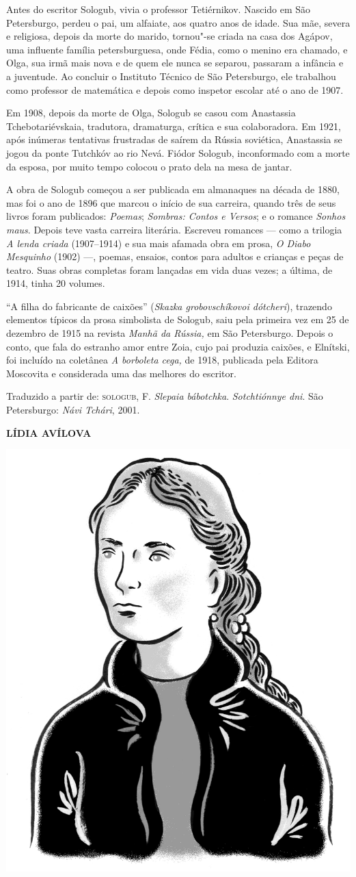 Antes do escritor Sologub, vivia o professor Tetiérnikov. Nascido em São
Petersburgo, perdeu o pai, um alfaiate, aos quatro anos de idade. Sua
mãe, severa e religiosa, depois da morte do marido, tornou"-se criada na
casa dos Agápov, uma influente família petersburguesa, onde Fédia, como
o menino era chamado, e Olga, sua irmã mais nova e de quem ele nunca se
separou, passaram a infância e a juventude. Ao concluir o Instituto
Técnico de São Petersburgo, ele trabalhou como professor de matemática e
depois como inspetor escolar até o ano de 1907.

Em 1908, depois da morte de Olga, Sologub se casou com Anastassia
Tchebotariévskaia, tradutora, dramaturga, crítica e sua colaboradora. Em
1921, após inúmeras tentativas frustradas de saírem da Rússia soviética,
Anastassia se jogou da ponte Tutchkóv ao rio Nevá. Fiódor Sologub,
inconformado com a morte da esposa, por muito tempo colocou o prato dela
na mesa de jantar.

A obra de Sologub começou a ser publicada em almanaques na década de
1880, mas foi o ano de 1896 que marcou o início de sua carreira, quando
três de seus livros foram publicados: \emph{Poemas}; \emph{Sombras:
Contos e Versos}; e o romance \emph{Sonhos maus}. Depois teve vasta
carreira literária. Escreveu romances --- como a trilogia \emph{A lenda
criada} (1907--1914) e sua mais afamada obra em
prosa, \emph{O Diabo Mesquinho} (1902) ---, poemas,
ensaios, contos para adultos e crianças e peças de teatro. Suas obras
completas foram lançadas em vida duas vezes; a última, de 1914, tinha 20
volumes.

``A filha do fabricante de caixões'' (\emph{Skazka grobovschíkovoi
dótcheri}), trazendo elementos típicos da prosa simbolista de Sologub,
saiu pela primeira vez em 25 de dezembro de 1915 na revista \emph{Manhã
da Rússia,} em São Petersburgo. Depois o conto, que fala do estranho
amor entre Zoia, cujo pai produzia caixões, e Elnítski, foi incluído na
coletânea \emph{A borboleta cega,} de 1918, publicada pela Editora
Moscovita e considerada uma das melhores do escritor.

Traduzido a partir de:
\textsc{sologub}, F. \emph{Slepaia bábotchka}. \emph{Sotchtiónnye dni}. São
Petersburgo: \emph{Návi Tchári}, 2001.

\bigskip
\noindent\textbf{LÍDIA AVÍLOVA}\medskip

\noindent\includegraphics[width=.8in]{./imgs/autor8.jpg}

